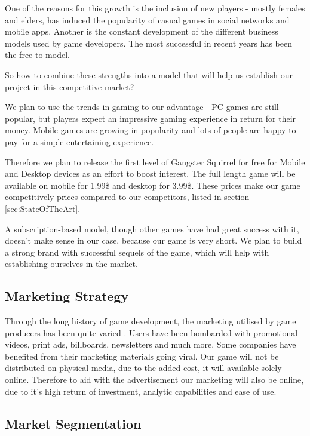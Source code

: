 \documentclass[12p]{article}
\begin{document}
One of the reasons for this growth is the inclusion of new players - mostly females and elders, has induced the popularity of casual games in social networks and mobile apps. Another is the constant development of the different business models used by game developers. The most successful in recent years has been the free-to-model.\cite{BusinessModelsAndStrategy}

So how to combine these strengths into a model that will help us establish our project in this competitive market?

We plan to use the trends in gaming to our advantage - PC games are still popular, but players expect an impressive gaming experience in return for their money. Mobile games are growing in popularity and lots of people are happy to pay for a simple entertaining experience.

Therefore we plan to release the first level of Gangster Squirrel for free for Mobile and Desktop devices as an effort to boost interest. The full length game will be available on mobile for 1.99\$ and desktop for 3.99\$. These prices make our game competitively prices compared to our competitors, listed in section \ref{sec:StateOfTheArt}.

A subscription-based model, though other games have had great success with it, doesn’t make sense in our case, because our game is very short. We plan to build a strong brand with successful sequels of the game, which will help with establishing ourselves in the market.

\subsection{Marketing Strategy}
Through the long history of game development, the marketing utilised by game producers has been quite varied \cite{MarketingStrategyExamples}. Users have been bombarded with promotional videos, print ads, billboards, newsletters and much more. Some companies have benefited from their marketing materials going viral.
Our game will not be distributed on physical media, due to the added cost, it will available solely online. Therefore to aid with the advertisement our marketing will also be online, due to it's high return of investment, analytic capabilities and ease of use.


\subsection{Market Segmentation}
\end{document}
